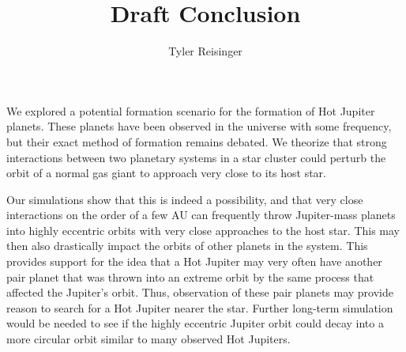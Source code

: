 \documentclass[12pt]{article}
\author{Tyler Reisinger}
\title{Draft Conclusion}
\date{}
\begin{document}
\maketitle

We explored a potential formation scenario for the formation of Hot Jupiter
planets. These planets have been observed in the universe with some frequency,
but their exact method of formation remains debated. 
We theorize that strong interactions between two planetary systems in a star
cluster could perturb the orbit of a normal gas giant to approach very close to
its host star. 

Our simulations show that this is indeed a possibility, and that very close
interactions on the order of a few AU can frequently throw Jupiter-mass planets into
highly eccentric orbits with very close approaches to the host star. 
This may then also drastically impact the orbits of other planets
in the system. This provides support for the idea that a Hot Jupiter may very
often have another pair planet that was thrown into an extreme orbit by the same
process that affected the Jupiter's orbit. Thus,
observation of these pair planets may provide reason to search for a Hot Jupiter
nearer the star.
Further long-term simulation would be needed to see if the highly eccentric Jupiter
orbit could decay into a more circular orbit similar to many observed Hot Jupiters.
\end{document}
